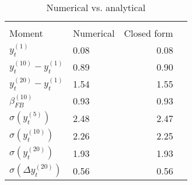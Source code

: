 \begin{table}[htbp]\centering  
 \bgroup  
 \def\arraystretch{1.25}\caption{Numerical vs. analytical} 
\begin{tabular}{llrr} 
\hline\hline 
\multicolumn{3}{c}{} \\ 
Moment & Numerical  & Closed form \\ 
\hline 
$y_{t}^{(1)}$ & 0.08 & 0.08  \\ 
$y_{t}^{(10)}-y_{t}^{(1)}$ & 0.89 &  0.90  \\ 
$y_{t}^{(20)}-y_{t}^{(1)}$ & 1.54 &  1.55  \\ 
$ \beta^{(10)}_{FB}$ & 0.93 & 0.93 \\ 
$\sigma(y_{t}^{(5)})$ & 2.48 & 2.47  \\ 
$\sigma(y_{t}^{(10)})$ & 2.26 & 2.25  \\ 
$\sigma(y_{t}^{(20)})$ & 1.93 & 1.93  \\ 
$\sigma(\Delta y_{t}^{(20)})$ & 0.56 & 0.56  \\ 
\hline\hline 
\end{tabular} 
 \egroup 
\end{table} 
